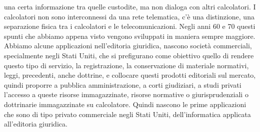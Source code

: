 una certa informazione tra quelle custodite, ma non dialoga con altri calcolatori. I calcolatori non sono interconnessi da una rete telematica, c'è una distinzione, una separazione fisica tra i calcolatori e le telecomunicazioni. Negli anni 60 e 70 questi spunti che abbiamo appena visto vengono sviluppati in maniera sempre maggiore. Abbiamo alcune applicazioni nell'editoria giuridica, nascono società commerciali, specialmente negli Stati Uniti, che si prefigurano come obiettivo quello di rendere questo tipo di servizio, la registrazione, la conservazione di materiale normativi, leggi, precedenti, anche dottrine, e collocare questi prodotti editoriali sul mercato, quindi proporre a pubblica amministrazione, a corti giudiziari, a studi privati l'accesso a queste risorse immagazzinate, risorse normative o giurisprudenziali o dottrinarie immagazzinate su calcolatore. Quindi nascono le prime applicazioni che sono di tipo privato commerciale negli Stati Uniti, dell'informatica applicata all'editoria giuridica. 


